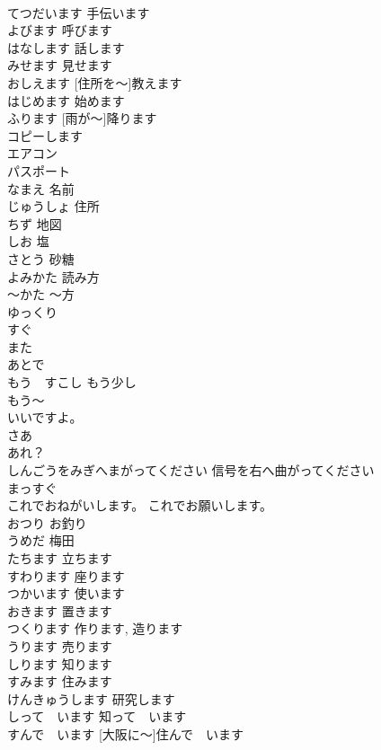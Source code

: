 \documentclass[8pt]{extreport}
\begin{document}
\begin{CJK}{UTF8}{min}
\\	てつだいます	手伝います	
\\	よびます	呼びます	
\\	はなします	話します	
\\	みせます	見せます	
\\	[じゅうしょを～]おしえます	[住所を～]教えます	
\\	はじめます	始めます	
\\	[あめが～] ふります	[雨が～]降ります	
\\	コピーします			
\\	エアコン			
\\	パスポート			
\\	なまえ	名前	
\\	じゅうしょ	住所	
\\	ちず	地図	
\\	しお	塩	
\\	さとう	砂糖	
\\	よみかた	読み方	
\\	～かた	～方	
\\	ゆっくり			
\\	すぐ			
\\	また			
\\	あとで			
\\	もう　すこし	もう少し	
\\	もう～			
\\	いいですよ。			
\\	さあ			
\\	あれ？			
\\	しんごうをみぎへまがってください	信号を右へ曲がってください	
\\	まっすぐ			
\\	これでおねがいします。	これでお願いします。	
\\	おつり	お釣り	
\\	うめだ	梅田	
\\	たちます	立ちます	
\\	すわります	座ります	
\\	つかいます	使います	
\\	おきます	置きます	
\\	つくります	作ります, 造ります	
\\	うります	売ります	
\\	しります	知ります	
\\	すみます	住みます	
\\	けんきゅうします	研究します	
\\	しって　います	知って　います	
\\	[おおさかに～]すんで　います	[大阪に～]住んで　います	

\end{CJK}
\end{document}
